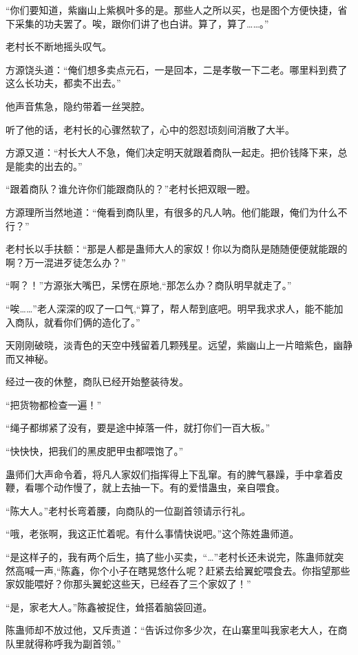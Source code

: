 
\begin{this_body}

“你们要知道，紫幽山上紫枫叶多的是。那些人之所以买，也是图个方便快捷，省下采集的功夫罢了。唉，跟你们讲了也白讲。算了，算了……。”

老村长不断地摇头叹气。

方源饶头道：“俺们想多卖点元石，一是回本，二是孝敬一下二老。哪里料到费了这么长功夫，都卖不出去。”

他声音焦急，隐约带着一丝哭腔。

听了他的话，老村长的心骤然软了，心中的怨怼顷刻间消散了大半。

方源又道：“村长大人不急，俺们决定明天就跟着商队一起走。把价钱降下来，总是能卖的出去的。”

“跟着商队？谁允许你们能跟商队的？”老村长把双眼一瞪。

方源理所当然地道：“俺看到商队里，有很多的凡人呐。他们能跟，俺们为什么不行？”

老村长以手扶额：“那是人都是蛊师大人的家奴！你以为商队是随随便便就能跟的啊？万一混进歹徒怎么办？”

“啊？！”方源张大嘴巴，呆愣在原地,“那怎么办？商队明早就走了。”

“唉……”老人深深的叹了一口气,“算了，帮人帮到底吧。明早我求求人，能不能加入商队，就看你们俩的造化了。”

天刚刚破晓，淡青色的天空中残留着几颗残星。远望，紫幽山上一片暗紫色，幽静而又神秘。

经过一夜的休整，商队已经开始整装待发。

“把货物都检查一遍！”

“绳子都绑紧了没有，要是途中掉落一件，就打你们一百大板。”

“快快快，把我们的黑皮肥甲虫都喂饱了。”

蛊师们大声命令着，将凡人家奴们指挥得上下乱窜。有的脾气暴躁，手中拿着皮鞭，看哪个动作慢了，就上去抽一下。有的爱惜蛊虫，亲自喂食。

“陈大人。”老村长弯着腰，向商队的一位副首领请示行礼。

“哦，老张啊，我这正忙着呢。有什么事情快说吧。”这个陈姓蛊师道。

“是这样子的，我有两个后生，搞了些小买卖，“…”老村长还未说完，陈蛊师就突然高喊一声,“陈鑫，你个小子在瞎晃悠什么呢？赶紧去给翼蛇喂食去。你指望那些家奴能喂好？你那头翼蛇这些天，已经吞了三个家奴了！”

“是，家老大人。”陈鑫被捉住，耸搭着脑袋回道。

陈蛊师却不放过他，又斥责道：“告诉过你多少次，在山寨里叫我家老大人，在商队里就得称呼我为副首领。”


\end{this_body}
